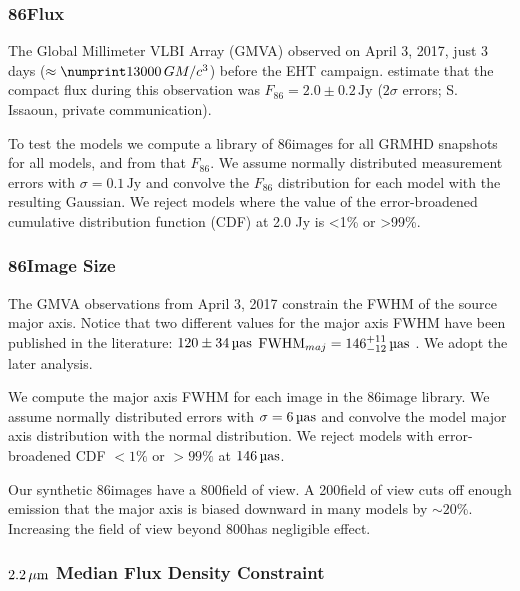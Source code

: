 \subsubsection{86\GHz Flux}

The Global Millimeter VLBI Array (GMVA) observed \sgra on April 3, 2017, just 3 days ($\approx \no{13000}\,\tg$) before the EHT campaign.
\citet{2019ApJ...871...30I} estimate that the compact flux during this observation was $F_{86} = 2.0 \pm 0.2\,\mathrm{Jy}$ ($2\sigma$ errors; S. Issaoun, private communication).

To test the models we compute a library of 86\GHz images for all GRMHD snapshots for all models, and from that $F_{86}$.
We assume normally distributed measurement errors with $\sigma = 0.1\,\mathrm{Jy}$ and convolve the $F_{86}$ distribution for each model with the resulting Gaussian.
We reject models where the value of the error-broadened cumulative distribution function (CDF) at 2.0 Jy is <1\% or >99\%.

\subsubsection{86\GHz Image Size}\label{sec:86size}

The GMVA observations from April 3, 2017 constrain the FWHM of the source major axis.
Notice that two different values for the major axis FWHM have been published in the literature: $120 \pm 34\uas$ \citep{2019ApJ...871...30I}
${\rm FWHM}_{maj} = 146^{+11}_{-12}\uas$ \citep[95\% confidence][]{2021ApJ...915...99I}.
We adopt the later analysis.

We compute the major axis FWHM for each image in the 86\GHz image library.
We assume normally distributed errors with $\sigma = 6\uas$ and convolve the model major axis distribution with the normal distribution.
We reject models with error-broadened CDF $< 1\%$ or $> 99\%$ at $146\uas$.

Our synthetic 86\GHz images have a 800\uas field of view.
A 200\uas field of view cuts off enough emission that the major axis is biased downward in many models by $\sim 20\%$.
Increasing the field of view beyond 800\uas has negligible effect.

\subsubsection{\texorpdfstring{$2.2\,\mu\mathrm{m}$}{2um} Median Flux Density Constraint}\label{subsec:nir}

